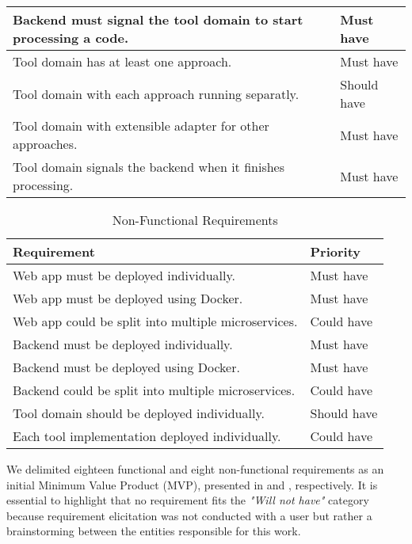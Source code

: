 \begin{table}[!htb]
\begin{center}
\begin{tabular}[c]{p{16em}|p{8em}}
      \hline Backend must signal the tool domain to start processing a code. & {Must have} \\
      \hline Tool domain has at least one approach. & {Must have} \\
      \hline Tool domain with each approach running separatly. & {Should have} \\
      \hline Tool domain with extensible adapter for other approaches. & {Must have} \\
      \hline Tool domain signals the backend when it finishes processing. & {Must have} \\
    \end{tabular}
  \end{center}
\end{table}

\begin{table}[!htb] \caption{Non-Functional Requirements} \label{tab:non-functional-requirements}
  \begin{center}
    \begin{tabular}[c]{p{16em}|p{8em}}
      \textbf{Requirement} &
      \textbf{Priority} \\
      \hline Web app must be deployed individually. & {Must have} \\
      \hline Web app must be deployed using Docker. & {Must have} \\
      \hline Web app could be split into multiple microservices. & {Could have} \\
      \hline Backend must be deployed individually. & {Must have} \\
      \hline Backend must be deployed using Docker. & {Must have} \\
      \hline Backend could be split into multiple microservices. & {Could have} \\
      \hline Tool domain should be deployed individually. & {Should have} \\
      \hline Each tool implementation deployed individually. & {Could have} \\
    \end{tabular}
  \end{center}
\end{table}

We delimited eighteen functional and eight non-functional requirements as an initial Minimum Value Product (MVP), presented in  and , respectively. It is essential to highlight that no requirement fits the \textit{"Will not have"} category because requirement elicitation was not conducted with a user but rather a brainstorming between the entities responsible for this work.

